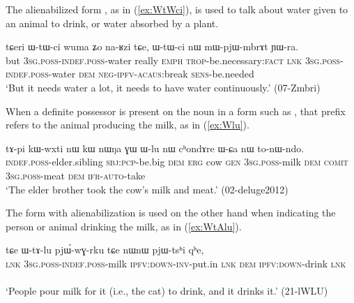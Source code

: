 The alienabilized form , as in (\ref{ex:WtWci}), is used to talk about water given to an animal to drink, or water absorbed by a plant.

 \begin{exe}
\ex \label{ex:WtWci}
 \gll tɕeri ɯ-tɯ-ci wuma ʑo na-ʁzi tɕe, ɯ-tɯ-ci nɯ mɯ-pjɯ-mbrɤt ɲɯ-ra. \\
 but \textsc{3sg}.\textsc{poss}-\textsc{indef}.\textsc{poss}-water really \textsc{emph} \textsc{trop}-be.necessary:\textsc{fact} \textsc{lnk} \textsc{3sg}.\textsc{poss}-\textsc{indef}.\textsc{poss}-water \textsc{dem} \textsc{neg}-\textsc{ipfv}-\textsc{acaus}:break \textsc{sens}-be.needed \\
 \glt `But it needs water a lot, it needs to have water continuously.' (07-Zmbri)
 \end{exe}
 
 When a definite possessor is present on the noun  in a form such as , that prefix refers to the animal producing the milk, as in (\ref{ex:Wlu}).
 
 \begin{exe}
\ex \label{ex:Wlu}
 \gll 
tɤ-pi kɯ-wxti nɯ kɯ nɯŋa ɣɯ ɯ-lu nɯ cʰondɤre ɯ-ɕa nɯ to-nɯ-ndo. \\
\textsc{indef}.\textsc{poss}-elder.sibling \textsc{sbj}:\textsc{pcp}-be.big \textsc{dem} \textsc{erg} cow \textsc{gen} \textsc{3sg}.\textsc{poss}-milk \textsc{dem} \textsc{comit} \textsc{3sg}.\textsc{poss}-meat \textsc{dem} \textsc{ifr}-\textsc{auto}-take \\
\glt `The elder brother took the cow's milk and meat.' (02-deluge2012)
 \end{exe}

The form  with alienabilization is used on the other hand when indicating the person or animal drinking the milk, as in (\ref{ex:WtAlu}).

\begin{exe}
\ex \label{ex:WtAlu}
 \gll tɕe ɯ-tɤ-lu pjɯ́-wɣ-rku tɕe nɯnɯ pjɯ-tsʰi qʰe,\\
\textsc{lnk} \textsc{3sg}.\textsc{poss}-\textsc{indef}.\textsc{poss}-milk \textsc{ipfv}:\textsc{down}-\textsc{inv}-put.in \textsc{lnk} \textsc{dem} \textsc{ipfv}:\textsc{down}-drink \textsc{lnk}\\ \\
\glt `People pour milk for it (i.e., the cat) to drink, and it drinks it.' (21-lWLU)
\end{exe}


